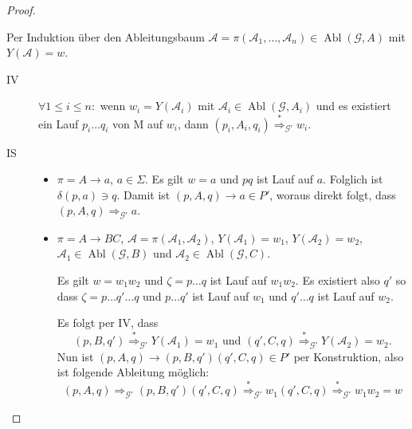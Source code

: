 \begin{proof}
\begin{itemize}
    Per Induktion über den Ableitungsbaum $\mathcal{A} = \pi(\mathcal{A}_1,\ldots,\mathcal{A}_n) \in \operatorname{Abl}(\mathcal{G}, A)$ mit $Y(\mathcal{A}) = w$.
    \begin{description}
      \item[IV] $\forall 1 \le i \le n:$ wenn $w_i = Y(\mathcal{A}_i)$ mit $\mathcal{A}_i \in \operatorname{Abl}(\mathcal{G}, A_i)$ und es existiert ein Lauf  $p_i\ldots q_i$  von M auf $w_i$, dann $(p_i, A_i, q_i) \stackrel{*}{\Longrightarrow}_{\mathcal{G}'} w_i$.
      \item[IS] \hfill
        \begin{itemize}
        \item $\pi = A \to a$, $a \in \Sigma$.
          Es gilt $w = a$ und $pq$ ist Lauf auf $a$.
          Folglich ist $\delta(p, a) \ni q$. Damit ist $(p,A,q) \to a \in P'$, woraus direkt folgt, dass $(p,A,q) \Longrightarrow_{\mathcal{G}'} a$.
        \item $\pi = A \to BC$, $\mathcal{A} = \pi(\mathcal{A}_1, \mathcal{A}_2)$, $Y(\mathcal{A}_1) = w_1$, $Y(\mathcal{A}_2) = w_2$, \mbox{$\mathcal{A}_1 \in \operatorname{Abl}(\mathcal{G}, B)$} und $\mathcal{A}_2 \in \operatorname{Abl}(\mathcal{G}, C)$.

          Es gilt $w = w_1w_2$ und $\zeta = p\ldots q$ ist Lauf auf $w_1w_2$.
          Es existiert also $q'$ so dass $\zeta = p\ldots q' \ldots q$ und $p\ldots q'$ ist Lauf auf $w_1$ und $q' \ldots q$ ist Lauf auf $w_2$.

          Es folgt per IV, dass
          \begin{displaymath}
            (p, B, q') \stackrel{*}{\Longrightarrow}_{\mathcal{G}'} Y(\mathcal{A}_1) = w_1 \text{ und } (q', C, q) \stackrel{*}{\Longrightarrow}_{\mathcal{G}'} Y(\mathcal{A}_2) = w_2.
          \end{displaymath}
          Nun ist $(p,A,q) \to (p,B,q')(q',C,q) \in P'$ per Konstruktion, also ist folgende Ableitung möglich:
          \begin{displaymath}
            (p,A,q) \Longrightarrow_{\mathcal{G}'} (p,B,q')(q',C,q) \stackrel{*}{\Longrightarrow}_{\mathcal{G}'} w_1(q',C,q) \stackrel{*}{\Longrightarrow}_{\mathcal{G}'} w_1w_2 = w
          \end{displaymath}
        \end{itemize}
    \end{description}
  \end{itemize}
  \end{proof}
%
